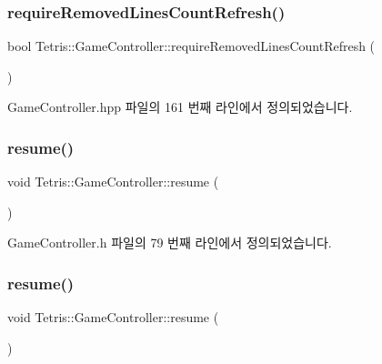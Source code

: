 \subsubsection{\texorpdfstring{require\+Removed\+Lines\+Count\+Refresh()}{requireRemovedLinesCountRefresh()}}
{\footnotesize\ttfamily bool Tetris\+::\+Game\+Controller\+::require\+Removed\+Lines\+Count\+Refresh (\begin{DoxyParamCaption}{ }\end{DoxyParamCaption})\hspace{0.3cm}{\ttfamily [inline]}}



Game\+Controller.\+hpp 파일의 161 번째 라인에서 정의되었습니다.

\mbox{\label{class_tetris_1_1_game_controller_ab9ff093ea91e3d248a8a287289e758b0}} 
\subsubsection{\texorpdfstring{resume()}{resume()}\hspace{0.1cm}{\footnotesize\ttfamily [1/2]}}
{\footnotesize\ttfamily void Tetris\+::\+Game\+Controller\+::resume (\begin{DoxyParamCaption}{ }\end{DoxyParamCaption})\hspace{0.3cm}{\ttfamily [inline]}}



Game\+Controller.\+h 파일의 79 번째 라인에서 정의되었습니다.

\mbox{\label{class_tetris_1_1_game_controller_ab9ff093ea91e3d248a8a287289e758b0}} 
\subsubsection{\texorpdfstring{resume()}{resume()}\hspace{0.1cm}{\footnotesize\ttfamily [2/2]}}
{\footnotesize\ttfamily void Tetris\+::\+Game\+Controller\+::resume (\begin{DoxyParamCaption}{ }\end{DoxyParamCaption})\hspace{0.3cm}{\ttfamily [inline]}}




